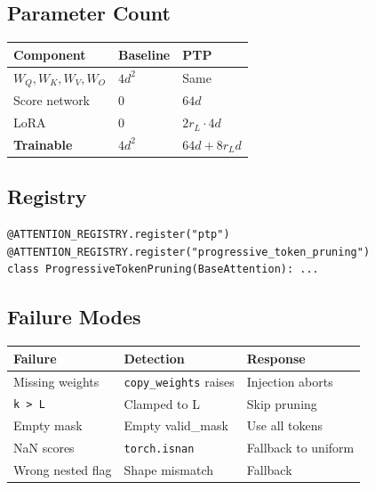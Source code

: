 \subsection{Parameter Count}

\begin{table}[H]
\centering
\small
\begin{tabular}{lll}
\toprule
\textbf{Component} & \textbf{Baseline} & \textbf{PTP} \\
\midrule
$W_Q, W_K, W_V, W_O$ & $4 d^2$ & Same \\
Score network & 0 & $64 d$ \\
LoRA & 0 & $2 r_L \cdot 4 d$ \\
\textbf{Trainable} & $4 d^2$ & \textbf{$64 d + 8 r_L d$} \\
\bottomrule
\end{tabular}
\end{table}

\subsection{Registry}

\begin{lstlisting}
@ATTENTION_REGISTRY.register("ptp")
@ATTENTION_REGISTRY.register("progressive_token_pruning")
class ProgressiveTokenPruning(BaseAttention): ...
\end{lstlisting}

\subsection{Failure Modes}

\begin{table}[H]
\centering
\small
\begin{tabular}{lll}
\toprule
\textbf{Failure} & \textbf{Detection} & \textbf{Response} \\
\midrule
Missing weights & \texttt{copy\_weights} raises & Injection aborts \\
\texttt{k > L} & Clamped to L & Skip pruning \\
Empty mask & Empty valid\_mask & Use all tokens \\
NaN scores & \texttt{torch.isnan} & Fallback to uniform \\
Wrong nested flag & Shape mismatch & Fallback \\
\bottomrule
\end{tabular}
\end{table}




